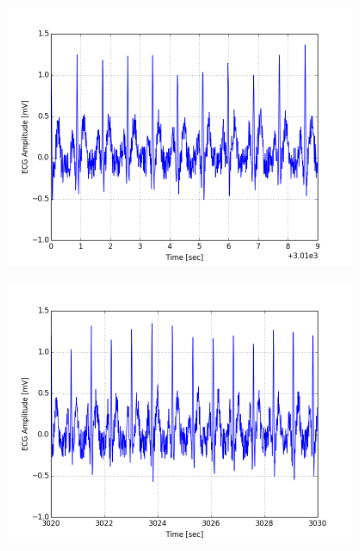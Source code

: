 \documentclass[paper=a4, fontsize=11pt]{scrartcl}
\numberwithin{equation}{section}		%
\numberwithin{figure}{section}			%
\numberwithin{table}{section}		    %
\begin{document}
\begin{appendices}
\begin{figure}[H]
	\centering
	\begin{subfigure}[b]{0.3\textwidth}
		\includegraphics[width=\textwidth]{sim/ecg_55}
	\end{subfigure}
	\begin{subfigure}[b]{0.3\textwidth}
		\includegraphics[width=\textwidth]{sim/ecg_56}
	\end{subfigure}
	\begin{subfigure}[b]{0.3\textwidth}

\end{subfigure}
\end{figure}
\end{appendices}
\end{document}
